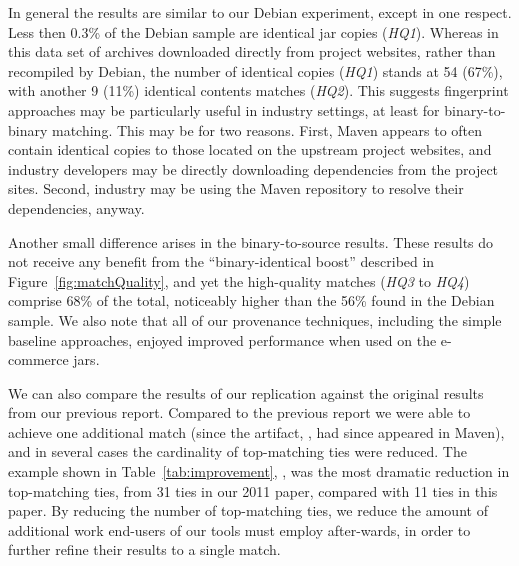 In general the results are similar to our Debian experiment, except in one
respect.  Less then 0.3\% of the Debian sample are identical jar copies
(\emph{HQ1}).  Whereas in this data set of archives downloaded directly
from project websites, rather than recompiled by Debian, the number of
identical copies (\emph{HQ1}) stands at 54 (67\%), with another 9 (11\%)
identical contents matches (\emph{HQ2}).  This suggests fingerprint
approaches may be particularly useful in industry settings, at least for
binary-to-binary matching.  This may be for two reasons.  First, Maven
appears to often contain identical copies to those located on the upstream
project websites, and industry developers may be directly downloading
dependencies from the project sites.  Second, industry may be using the
Maven repository to resolve their dependencies, anyway.

Another small difference arises in the binary-to-source results.
These results do not receive any benefit from the ``binary-identical
boost'' described in Figure~\ref{fig:matchQuality}, and yet the
high-quality matches (\emph{HQ3} to \emph{HQ4}) comprise 68\% of the total,
noticeably higher than the 56\% found in the Debian sample.
We also note that all of our
provenance techniques, including the simple baseline approaches, enjoyed
improved performance when used on the e-commerce jars.

We can also compare the results of our replication against the original
results from our previous report.  Compared to the previous report
we were able to achieve one additional match (since the artifact, ,
had since appeared in Maven), and in several cases the cardinality of top-matching
ties were reduced.   The example shown in Table~\ref{tab:improvement}, ,
was the most dramatic reduction in top-matching ties, from 31 ties in our 2011 paper,
compared with 11 ties in this paper.  By reducing the number of
top-matching ties, we reduce the amount of additional work end-users of our tools
must employ after-wards, in order to further refine their results to a single match.


